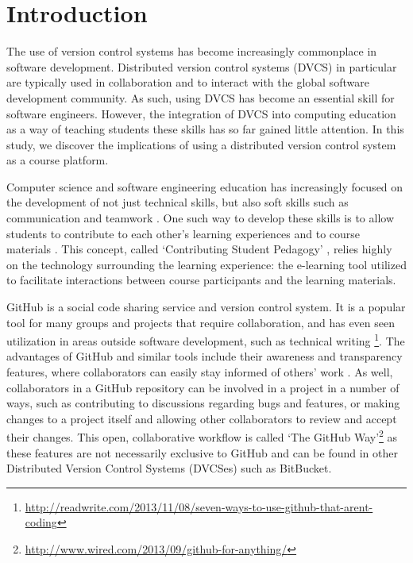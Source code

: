 \section{Introduction}


The use of version control systems has become increasingly commonplace in software development. Distributed version control systems (DVCS) in particular are typically used in collaboration and to interact with the global software development community. As such, using DVCS has become an essential skill for software engineers. However, the integration of DVCS into computing education as a way of teaching students these skills has so far gained little attention. In this study, we discover the implications of using a distributed version control system as a course platform.

Computer science and software engineering education has increasingly focused on the development of not just technical skills, but also soft skills such as communication and teamwork \cite{jazayeri2004education}. One such way to develop these skills is to allow students to contribute to each other's learning experiences and to course materials \cite{falkner2012supporting}. This concept, called `Contributing Student Pedagogy' \cite{hamer2008contributing}, relies highly on the technology surrounding the learning experience: the e-learning tool utilized to facilitate interactions between course participants and the learning materials.

GitHub is a social code sharing service and version control system. It is a popular tool for many groups and projects that require collaboration, and has even seen utilization in areas outside software development, such as technical writing \footnote{\url{http://readwrite.com/2013/11/08/seven-ways-to-use-github-that-arent-coding}}. The advantages of GitHub and similar tools include their awareness and transparency features, where collaborators can easily stay informed of others' work \cite{dabbish2012social}. As well, collaborators in a GitHub repository can be involved in a project in a number of ways, such as contributing to discussions regarding bugs and features, or making changes to a project itself and allowing other collaborators to review and accept their changes. This open, collaborative workflow is called `The GitHub Way'\footnote{\url{http://www.wired.com/2013/09/github-for-anything/}} as these features are not necessarily exclusive to GitHub and can be found in other Distributed Version Control Systems (DVCSes) such as BitBucket.

